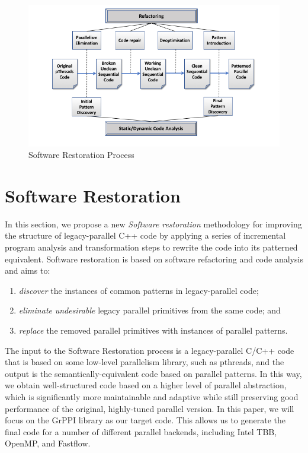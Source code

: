 \begin{figure}
\centering
\includegraphics[width=\textwidth]{images/HLPP2020Paper.png}
\caption{Software Restoration Process}
\label{fig:SoftRest}
\end{figure}

\section{Software Restoration}
\label{sec:methodology}


\noindent
In this section, we propose a new \emph{Software restoration} methodology %
for improving the structure of legacy-parallel C++ code by applying a series of incremental program analysis and transformation steps to rewrite the code into its patterned equivalent. %
Software restoration is based on software refactoring and code analysis and aims to:
\begin{enumerate}
\item \emph{discover} the instances of common patterns in legacy-parallel code;
\item \emph{eliminate} \emph{undesirable} legacy parallel primitives from the same code; and
\item \emph{replace} the removed parallel primitives with instances of parallel patterns.
\end{enumerate}
\noindent
The input to the Software Restoration process is a legacy-parallel C/C++ code that is based on some low-level parallelism library, such as pthreads, and the output is the semantically-equivalent code based on parallel patterns. In this way, we obtain well-structured code based on a higher level of parallel abstraction, which is significantly more maintainable and adaptive while still preserving
good performance of the original, highly-tuned parallel version. In this paper, we will focus on the GrPPI library as our target code. This allows us to generate the final code for a number of different parallel backends, including Intel TBB, OpenMP, and Fastflow.

